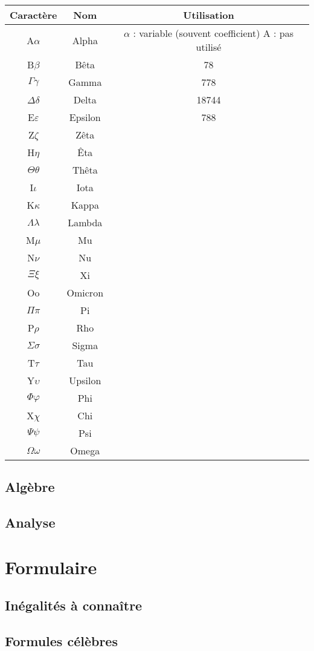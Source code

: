 \documentclass[12pt,a4paper]{exo_book}
\begin{document}
\begin{longtable}{| c | c | c |} 
 \hline
 Caractère & Nom & Utilisation \\
 \hline\hline
 \endhead
 A$\alpha$ & Alpha & \makecell[l]{$\alpha$ : variable (souvent coefficient) \\ A : pas utilisé} \\ \hline
 B$\beta$ & Bêta & 78 \\ \hline
 $\Gamma\gamma$ & Gamma & 778\\ \hline
 $\Delta\delta$ & Delta & 18744 \\ \hline
 E$\varepsilon$ & Epsilon & 788 \\ \hline
 Z$\zeta$ & Zêta & \\ \hline
 H$\eta$ &  Êta & \\ \hline
 $\Theta\theta$ & Thêta & \\ \hline
 I$\iota$ & Iota & \\ \hline
 K$\kappa$ & Kappa & \\ \hline
 $\Lambda\lambda$ & Lambda & \\ \hline
 M$\mu$ & Mu & \\ \hline
 N$\nu$ & Nu & \\ \hline
 $\Xi\xi$ & Xi & \\ \hline
 Oo & Omicron& \\\hline 
 $\Pi\pi$ & Pi & \\ \hline
 P$\rho$ & Rho & \\ \hline
 $\Sigma\sigma$ & Sigma & \\ \hline
 T$\tau$ & Tau & \\ \hline
 Y$\upsilon$ & Upsilon & \\ \hline
 $\Phi\varphi$ & Phi & \\ \hline
 X$\chi$ & Chi & \\ \hline
 $\Psi\psi$ & Psi & \\ \hline
 $\Omega\omega$ & Omega & \\ \hline
 
\end{longtable}

\section{Algèbre}

\section{Analyse}



\chapter{Formulaire}

\section{Inégalités à connaître}

\section{Formules célèbres}
\end{document}
